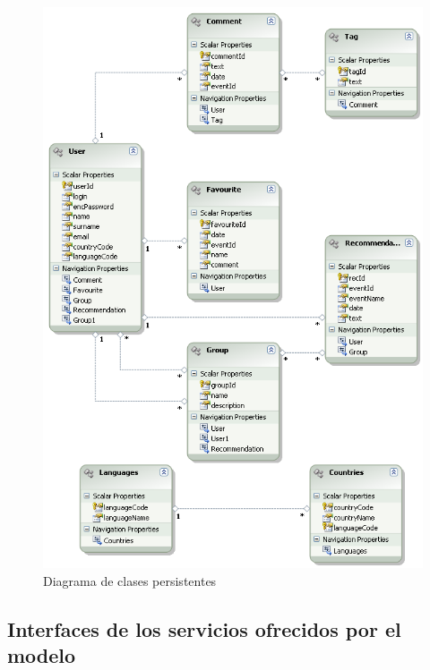 \documentclass[a4paper,twoside]{article}
\begin{document}
\begin{figure}[H]
  \centering
  \caption{Diagrama de clases persistentes}
  \includegraphics[height=.9\textheight]{img/Clases_persistentes.png}
\end{figure}

\newpage
\subsection{Interfaces de los servicios ofrecidos por el modelo}
\end{document}
